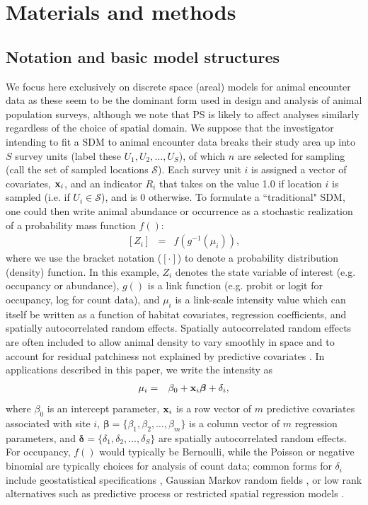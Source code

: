 \documentclass[times,mee,doublespace,]{besauth2}
\begin{document}
\section{Materials and methods}


\subsection{Notation and basic model structures}

We focus here exclusively on discrete space (areal) models for animal encounter data as these seem to be the dominant form used in design and analysis of animal population surveys, although we note that PS is likely to affect analyses similarly regardless of the choice of spatial domain.  We suppose that the investigator intending to fit a SDM to animal encounter data breaks their study area up into $S$ survey units (label these $U_1, U_2, \hdots, U_S$), of which $n$ are selected for sampling (call the set of sampled locations $\mathcal{S}$). Each survey unit $i$ is assigned a vector of covariates, ${\bf x}_i$, and an indicator $R_i$ that takes on the value 1.0 if location $i$ is sampled (i.e. if $U_i \in \mathcal{S}$), and is 0 otherwise.  To formulate a ``traditional" SDM, one could then write animal abundance or occurrence as a stochastic realization of a probability mass function $f()$:
\begin{eqnarray}
  \label{eq:process}
  [Z_i] & = & f(g^{-1}(\mu_i)),
\end{eqnarray}
where we use the bracket notation ($[\cdot]$) to denote a probability distribution (density) function.  In this example, $Z_i$ denotes the state variable of interest (e.g. occupancy or abundance), $g()$ is a link function (e.g. probit or logit for occupancy, log for count data), and $\mu_i$ is a link-scale intensity value which can itself be written as a function of habitat covariates, regression coefficients, and spatially autocorrelated random effects.  Spatially autocorrelated random effects are often included to allow animal density to vary smoothly in space and to account for residual patchiness not explained by predictive covariates \citep{Legendre1993,LichsteinEtAl2002}. In applications described in this paper, we write the intensity as
\begin{eqnarray}
\mu_i & = & \beta_0 + {\bf x}_i \boldsymbol{\beta}+\delta_i,
 \label{eq:mu}
\end{eqnarray}
where $\beta_0$ is an intercept parameter, ${\bf x}_i$ is a row vector of $m$ predictive covariates associated with site $i$, $\boldsymbol{\beta} = \{ \beta_1, \beta_2, \hdots, \beta_m \}$ is a column vector of $m$ regression parameters, and $\boldsymbol{\delta}=\{ \delta_1,\delta_2,\hdots,\delta_S \}$ are spatially autocorrelated random effects.  For occupancy, $f()$ would typically be Bernoulli, while the Poisson or negative binomial are typically choices for analysis of count data; common forms for $\delta_i$ include geostatistical specifications \citep{Cressie1993,DiggleEtAl1998}, Gaussian Markov random fields \citep[e.g. conditionally autoregressive models;][]{RueHeld2005}, or low rank alternatives such as predictive process \citep{BanerjeeEtAl2008,LatimerEtAl2009} or restricted spatial regression models \citep{ReichEtAl2006,Hughes2013}.
\end{document}

